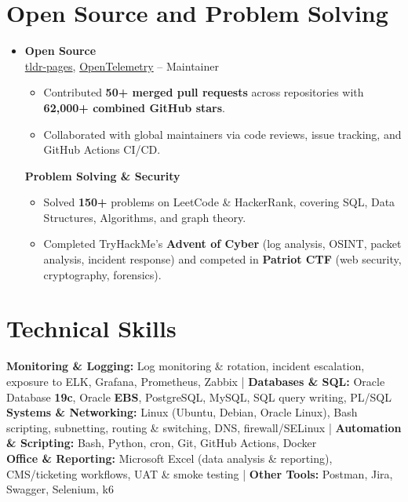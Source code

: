 \documentclass[a4paper]{article}
\newcommand{\subheading}[1]{\noindent \textbf{#1} \\}
\begin{document}
\section{Open Source and Problem Solving}
\begin{itemize}[leftmargin=0.15in, label={}, parsep=0pt]
\item
\small
\subheading{Open Source}
\href{https://github.com/tldr-pages/tldr}{tldr-pages}, \href{https://github.com/open-telemetry}{OpenTelemetry} --
Maintainer
\begin{itemize}[noitemsep, topsep=0pt]
    \item Contributed \textbf{50+ merged pull requests} across repositories with \textbf{62,000+ combined GitHub stars}.
    \item Collaborated with global maintainers via code reviews, issue tracking, and GitHub Actions CI/CD.
\end{itemize}

\vspace{0.5em}

\subheading{Problem Solving \& Security}
\begin{itemize}[noitemsep, topsep=0pt, partopsep=0pt]
\item Solved \textbf{150+} problems on LeetCode \& HackerRank, covering SQL, Data Structures, Algorithms, and graph theory.
\item Completed TryHackMe's \textbf{Advent of Cyber} (log analysis, OSINT, packet analysis, incident response) and competed in \textbf{Patriot CTF} (web security, cryptography, forensics).
\end{itemize}
\end{itemize}




\section{Technical Skills}
\begin{itemize}[leftmargin=0.15in, label={}]
\small{\item{
\textbf{Monitoring \& Logging:} Log monitoring \& rotation, incident escalation, exposure to ELK, Grafana, Prometheus, Zabbix \;|\;
\textbf{Databases \& SQL:} Oracle Database \textbf{19c}, Oracle \textbf{EBS}, PostgreSQL, MySQL, SQL query writing, PL/SQL\\
\textbf{Systems \& Networking:} Linux (Ubuntu, Debian, Oracle Linux), Bash scripting, subnetting, routing \& switching, DNS, firewall/SELinux \;|\;
\textbf{Automation \& Scripting:} Bash, Python, cron, Git, GitHub Actions, Docker\\
\textbf{Office \& Reporting:} Microsoft Excel (data analysis \& reporting), CMS/ticketing workflows, UAT \& smoke testing \;|\;
\textbf{Other Tools:} Postman, Jira, Swagger, Selenium, k6
}}
\end{itemize}
\end{document}
